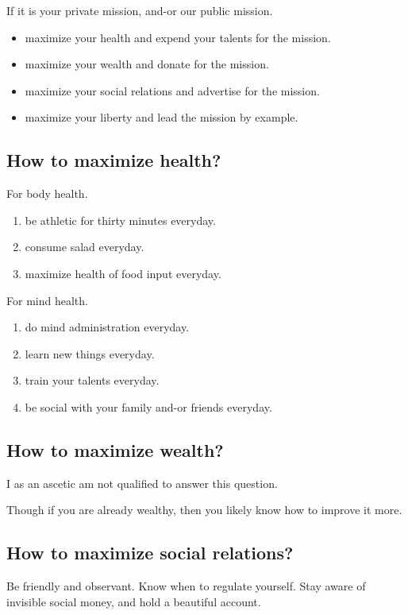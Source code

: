 \documentclass{report}
\begin{document}
If it is your private mission, and-or our public mission.

\begin{itemize}
  \item maximize your health and expend your talents for the mission.
  \item maximize your wealth and donate for the mission.
  \item maximize your social relations and advertise for  the mission.
  \item maximize your liberty and lead the mission by example.
\end{itemize}

\subsection{How to maximize health?}

For body health.
\begin{enumerate}
  \item be athletic for thirty minutes everyday.
  \item consume salad everyday.
  \item maximize health of food input everyday.
\end{enumerate}

For mind health.
\begin{enumerate}
  \item do mind administration everyday.
  \item learn new things everyday.
  \item train your talents everyday.
  \item be social with your family and-or friends everyday.
\end{enumerate}

\subsection{How to maximize wealth?}

I as an ascetic am not qualified to answer this question. 

Though if you are already wealthy, 
then you likely know how to improve it more.

\subsection{How to maximize social relations?}

Be friendly and observant.
Know when to regulate yourself.
Stay aware of invisible social money, 
and hold a beautiful account.
\end{document}
